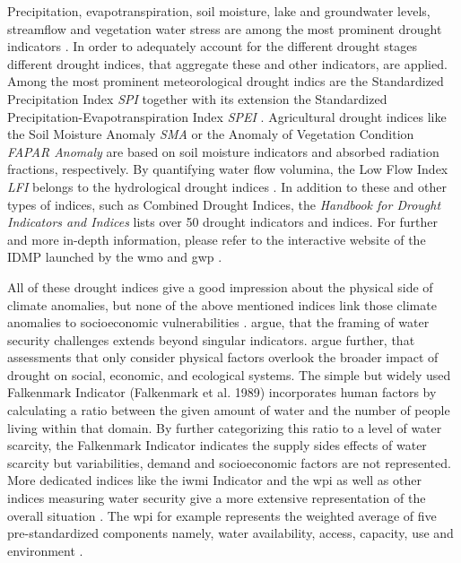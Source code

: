 Precipitation, evapotranspiration, soil moisture, lake and groundwater levels, streamflow and vegetation water stress are among the most prominent drought indicators \autocite{europeandroughtobservatoryDroughtIndicators2017}. In order to adequately account for the different drought stages different drought indices, that aggregate these and other indicators, are applied. Among the most prominent meteorological drought indics are the Standardized Precipitation Index \textit{SPI} together with its extension the Standardized Precipitation-Evapotranspiration Index \textit{SPEI} \autocite{europeandroughtobservatoryDroughtIndicators2017,ncarStandardizedPrecipitationEvapotranspiration,ncarStandardizedPrecipitationIndex}. Agricultural drought indices like the Soil Moisture Anomaly \textit{SMA} or the Anomaly of Vegetation Condition \textit{FAPAR Anomaly} are based on soil moisture indicators and absorbed radiation fractions, respectively. By quantifying water flow volumina, the Low Flow Index \textit{LFI} belongs to the hydrological drought indices \autocite{europeandroughtobservatoryDroughtIndicators2017, svobodaHandbookDroughtIndicators2016}. In addition to these and other types of indices, such as Combined Drought Indices, the \textit{Handbook for Drought Indicators and Indices} lists over 50 drought indicators and indices. For further and more in-depth information, please refer to the interactive website of the \acrfull{IDMP} launched by the \acrfull{wmo} and \acrfull*{gwp} \autocite{idmpIndicatorsIndicesIntegrated2021}. 

All of these drought indices give a good impression about the physical side of climate anomalies, but none of the above mentioned indices link those climate anomalies to socioeconomic vulnerabilities \autocite{enenkelWhyPredictClimate2020}. \autocite{mishraWaterSecurityChanging2021} argue, that the framing of water security challenges extends beyond singular indicators. \autocite{lackstromBackyardHydroclimatologyCitizen2022} argue further, that assessments that only consider physical factors overlook the broader impact of drought on social, economic, and ecological systems.
The simple but widely used Falkenmark Indicator (Falkenmark et al. 1989) incorporates human factors by calculating a ratio between the given amount of water and the number of people living within that domain. By further categorizing this ratio to a level of water scarcity, the Falkenmark Indicator indicates the supply sides effects of water scarcity but variabilities, demand and socioeconomic factors are not represented. More dedicated indices like the \acrfull*{iwmi} Indicator and the \acrfull*{wpi} as well as other indices measuring water security give a more extensive representation of the overall situation \autocite{arreguin-cortesMunicipalLevelWater2019,liuWaterScarcityAssessments2017}. The \acrshort{wpi} for example represents the weighted average of five pre-standardized components namely, water availability, access, capacity, use and environment \autocite{sullivanWaterPovertyIndex2003}.

